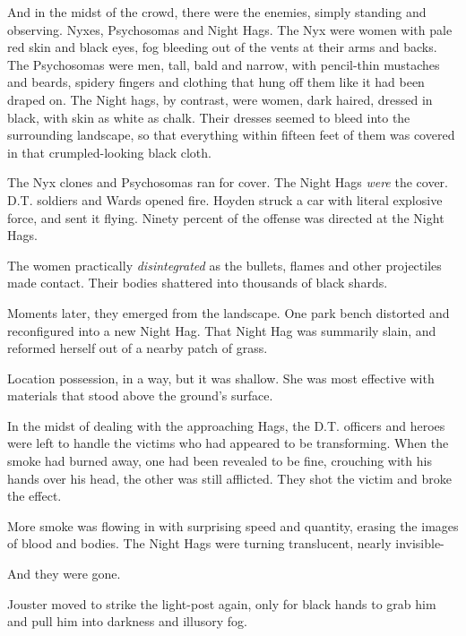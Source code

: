 And in the midst of the crowd, there were the enemies, simply standing and observing.  Nyxes, Psychosomas and Night Hags.  The Nyx were women with pale red skin and black eyes, fog bleeding out of the vents at their arms and backs.  The Psychosomas were men, tall, bald and narrow, with pencil-thin mustaches and beards, spidery fingers and clothing that hung off them like it had been draped on.  The Night hags, by contrast, were women, dark haired, dressed in black, with skin as white as chalk.  Their dresses seemed to bleed into the surrounding landscape, so that everything within fifteen feet of them was covered in that crumpled-looking black cloth.



The Nyx clones and Psychosomas ran for cover.  The Night Hags \emph{were} the cover.  D.T. soldiers and Wards opened fire.  Hoyden struck a car with literal explosive force, and sent it flying.  Ninety percent of the offense was directed at the Night Hags.



The women practically \emph{disintegrated} as the bullets, flames and other projectiles made contact.  Their bodies shattered into thousands of black shards.



Moments later, they emerged from the landscape.  One park bench distorted and reconfigured into a new Night Hag.  That Night Hag was summarily slain, and reformed herself out of a nearby patch of grass.



Location possession, in a way, but it was shallow.  She was most effective with materials that stood above the ground's surface.



In the midst of dealing with the approaching Hags, the D.T. officers and heroes were left to handle the victims who had appeared to be transforming.  When the smoke had burned away, one had been revealed to be fine, crouching with his hands over his head, the other was still afflicted.  They shot the victim and broke the effect.



More smoke was flowing in with surprising speed and quantity, erasing the images of blood and bodies.  The Night Hags were turning translucent, nearly invisible-



And they were gone.



Jouster moved to strike the light-post again, only for black hands to grab him and pull him into darkness and illusory fog.



